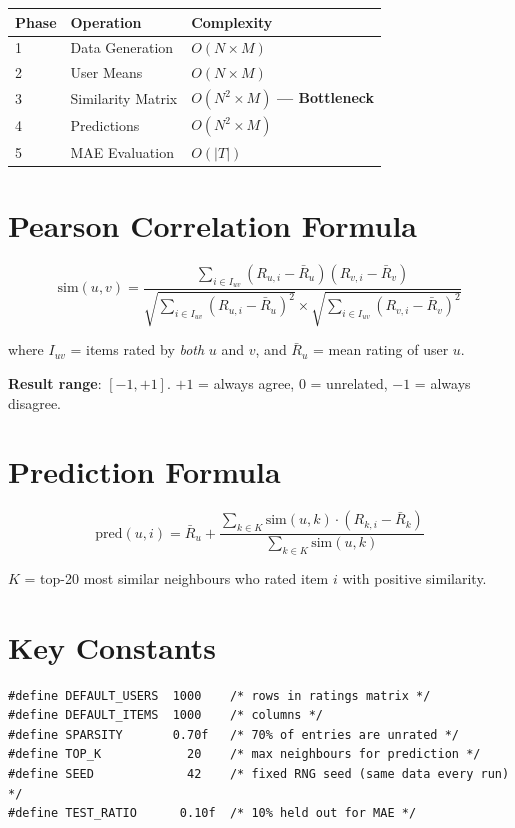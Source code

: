 \documentclass[12pt,a4paper]{report}
\begin{document}
\begin{center}
\begin{tabular}{lll}
\toprule
Phase & Operation & Complexity \\
\midrule
1 & Data Generation & $O(N \times M)$ \\
2 & User Means & $O(N \times M)$ \\
3 & Similarity Matrix & $O(N^2 \times M)$ \textbf{— Bottleneck} \\
4 & Predictions & $O(N^2 \times M)$ \\
5 & MAE Evaluation & $O(|T|)$ \\
\bottomrule
\end{tabular}
\end{center}

\section{Pearson Correlation Formula}

\[
\text{sim}(u,v) = \frac
{\sum_{i \in I_{uv}} (R_{u,i} - \bar{R}_u)(R_{v,i} - \bar{R}_v)}
{\sqrt{\sum_{i\in I_{uv}}(R_{u,i}-\bar{R}_u)^2}
 \times\sqrt{\sum_{i\in I_{uv}}(R_{v,i}-\bar{R}_v)^2}}
\]

where $I_{uv}$ = items rated by \emph{both} $u$ and $v$, and
$\bar{R}_u$ = mean rating of user $u$.

\textbf{Result range}: $[-1, +1]$. $+1$ = always agree, $0$ = unrelated,
$-1$ = always disagree.

\section{Prediction Formula}

\[
\text{pred}(u,i) = \bar{R}_u +
\frac{\sum_{k\in K}\text{sim}(u,k)\cdot(R_{k,i}-\bar{R}_k)}{\sum_{k\in K}\text{sim}(u,k)}
\]

$K$ = top-20 most similar neighbours who rated item $i$ with positive similarity.

\section{Key Constants}

\begin{lstlisting}
#define DEFAULT_USERS  1000    /* rows in ratings matrix */
#define DEFAULT_ITEMS  1000    /* columns */
#define SPARSITY       0.70f   /* 70% of entries are unrated */
#define TOP_K            20    /* max neighbours for prediction */
#define SEED             42    /* fixed RNG seed (same data every run) */
#define TEST_RATIO      0.10f  /* 10% held out for MAE */
\end{lstlisting}
\end{document}
